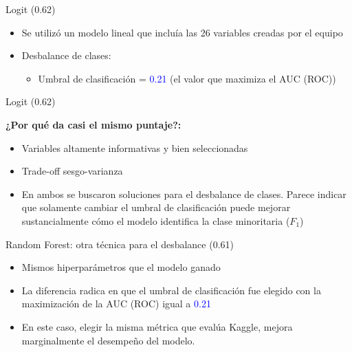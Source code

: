 \documentclass[11pt]{beamer}
\begin{document}
\begin{frame}{Logit (0.62)}
\begin{itemize}
    \item Se utilizó un modelo lineal que incluía las 26 variables creadas por el equipo
    \item Desbalance de clases: 
\begin{itemize}
    \item Umbral de clasificación = \textcolor{blue}{0.21} (el valor que maximiza el AUC (ROC))
\end{itemize}
\end{itemize}
\end{frame}

\begin{frame}{Logit (0.62)}
    \item \textbf{¿Por qué da casi el mismo puntaje?:}
    \begin{itemize}
    \item Variables altamente informativas y bien seleccionadas
    \item Trade-off sesgo-varianza
    \item En ambos se buscaron soluciones para el desbalance de clases. Parece indicar que solamente cambiar el umbral de clasificación puede mejorar sustancialmente cómo el modelo identifica la clase minoritaria ($F_1$)
    \end{itemize}
\end{frame}



\begin{frame}{Random Forest: otra técnica para el desbalance (0.61)}
\begin{itemize}
    \item Mismos hiperparámetros que el modelo ganado
    \item La diferencia radica en que el umbral de clasificación fue elegido con la maximización de la AUC (ROC) igual a \textcolor{blue}{0.21}
    \item En este caso, elegir la misma métrica que evalúa Kaggle, mejora marginalmente el desempeño del modelo.
    
\end{itemize}
    
\end{frame}
\end{document}
